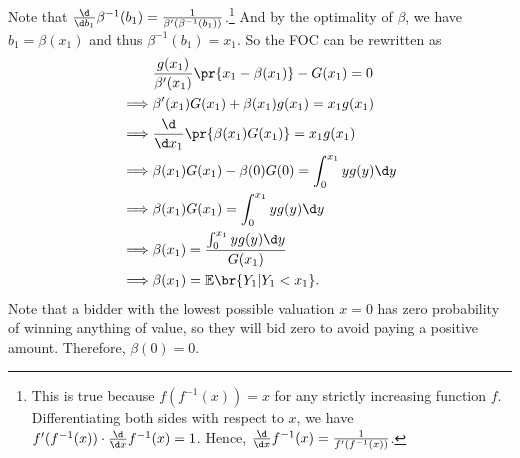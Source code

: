Note that $\frac{\d}{\d b_1}\beta^{-1}(b_1) = \frac{1}{\beta'(\beta^{-1}(b_1))}$.\footnote{
This is true because $f(f^{-1}(x)) = x$ for any strictly increasing function $f$. Differentiating both sides with respect to $x$, we have $f'(f^{-1}(x))\cdot \frac{\d}{\d x}f^{-1}(x) = 1$. Hence, $\frac{\d}{\d x}f^{-1}(x) = \frac{1}{f'(f^{-1}(x))}$.
} And by the optimality of $\beta$, we have $b_1 = \beta(x_1)$ and thus $\beta^{-1}(b_1) = x_1$. So the FOC can be rewritten as
\[
\begin{aligned}
  & \frac{g(x_1)}{\beta'(x_1)}\pr{x_1-\beta(x_1)}-G(x_1) = 0\\
  \implies  & \beta'(x_1)G(x_1)+\beta(x_1)g(x_1) = x_1 g(x_1)\\
  \implies  & \frac{\d}{\d x_1}\pr{\beta(x_1)G(x_1)} = x_1 g(x_1)\\
  \implies & \beta(x_1)G(x_1)-\beta(0)G(0) = \int_0^{x_1} y g(y) \d y\\
  \implies & \beta(x_1)G(x_1)= \int_0^{x_1} y g(y) \d y\\
  \implies & \beta(x_1) = \frac{\int_0^{x_1} y g(y) \d y}{G(x_1)}\\
  \implies & \beta(x_1) = \mathbb E\br{Y_1|Y_1 < x_1}.
\end{aligned}
\]
Note that a bidder with the lowest possible valuation $x=0$ has zero probability of winning anything of value, so they will bid zero to avoid paying a positive amount. Therefore, $\beta(0) = 0$. 
